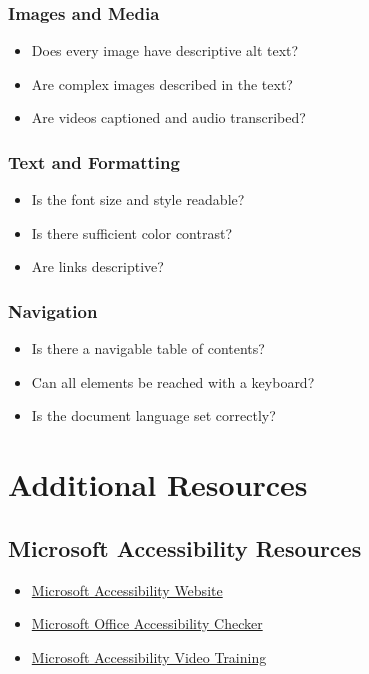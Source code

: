\subsubsection{Images and Media}\label{ch15:sssec:checklist-images}
\begin{itemize}
	\item Does every image have descriptive alt text?
	\item Are complex images described in the text?
	\item Are videos captioned and audio transcribed?
\end{itemize}

\subsubsection{Text and Formatting}\label{ch15:sssec:checklist-text}
\begin{itemize}
	\item Is the font size and style readable?
	\item Is there sufficient color contrast?
	\item Are links descriptive?
\end{itemize}

\subsubsection{Navigation}\label{ch15:sssec:checklist-nav}
\begin{itemize}
	\item Is there a navigable table of contents?
	\item Can all elements be reached with a keyboard?
	\item Is the document language set correctly?
\end{itemize}

\section{Additional Resources}\label{ch15:sec:additional-resources}

\subsection{Microsoft Accessibility Resources}\label{ch15:ssec:ms-resources}
\begin{itemize}
	\item \href{https://www.microsoft.com/en-us/accessibility}{Microsoft Accessibility Website}
	\item \href{https://support.microsoft.com/en-us/office/make-your-content-accessible-to-everyone-with-the-accessibility-checker-38059c2d-45ef-4830-9797-618f0e96f3ab}{Microsoft Office Accessibility Checker}
	\item \href{https://support.microsoft.com/en-us/topic/accessibility-video-training-71572a1d-5659-4200-81c6-76dc3b4b82fe}{Microsoft Accessibility Video Training}
\end{itemize}

